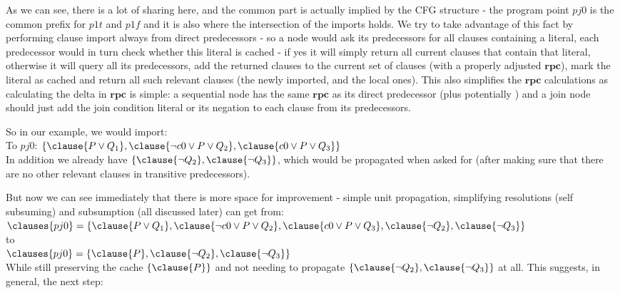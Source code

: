 As we can see, there is a lot of sharing here, and the common part is actually implied by the CFG structure - 
the program point $pj0$ is the common prefix for $p1t$ and $p1f$ and it is also where the intersection of the imports holds. 
We try to take advantage of this fact by performing clause import always from direct predecessors - so a node would ask its predecessors for all clauses containing a literal, each predecessor would in turn check whether this literal is cached - if yes it will simply return all current clauses that contain that literal, otherwise it will query all its predecessors, add the returned clauses to the current set of clauses (with a properly adjusted $\mathbf{rpc}$), mark the literal as cached and return all such relevant clauses (the newly imported, and the local ones).
This also simplifies the $\mathbf{rpc}$ calculations as calculating the delta in $\mathbf{rpc}$ is simple: a sequential node has the same $\mathbf{rpc}$ as its direct predecessor (plus potentially ) and a join node should just add the join condition literal or its negation to each clause from its predecessors.

So in our example, we would import:\\
To $pj0$: $\{ \clause{P \lor Q_1}, \clause{\lnot c0 \lor P \lor Q_2}, \clause{c0 \lor P \lor Q_3}\}$ \\
In addition we already have $\{\clause{\lnot Q_2}, \clause{\lnot Q_3} \}$, which would be propagated when asked for (after making sure  that there are no other relevant clauses in transitive predecessors).

But now we can see immediately that there is more space for improvement - simple unit propagation, simplifying resolutions (self subsuming) and subsumption (all discussed later) can get from:\\
$\clauses{pj0}=\{ \clause{P \lor Q_1}, \clause{\lnot c0 \lor P \lor Q_2}, \clause{c0 \lor P \lor Q_3}, \clause{\lnot Q_2}, \clause{\lnot Q_3} \}$ \\ 
to \\
$\clauses{pj0}=\{ \clause{P}, \clause{\lnot Q_2}, \clause{\lnot Q_3} \}$ \\ 
While still preserving the cache $\{ \clause{P} \}$ and not needing to propagate $\{\clause{\lnot Q_2}, \clause{\lnot Q_3} \}$ at all. 
This suggests, in general, the next step:

